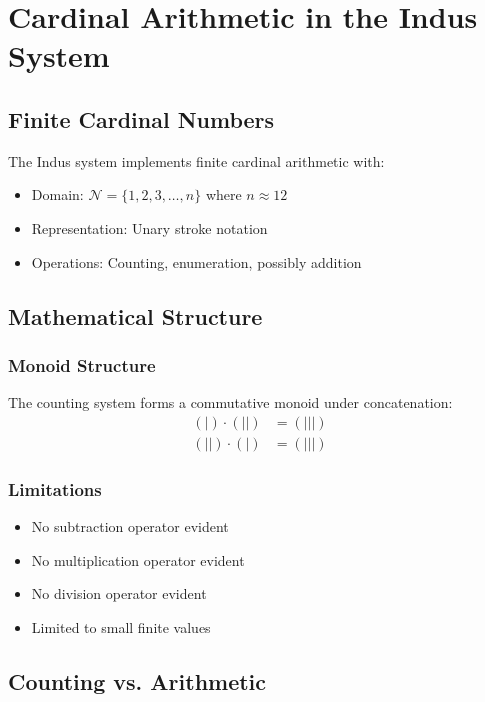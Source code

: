 \section{Cardinal Arithmetic in the Indus System}

\subsection{Finite Cardinal Numbers}

The Indus system implements finite cardinal arithmetic with:
\begin{itemize}
    \item Domain: $\mathcal{N} = \{1, 2, 3, \ldots, n\}$ where $n \approx 12$
    \item Representation: Unary stroke notation
    \item Operations: Counting, enumeration, possibly addition
\end{itemize}

\subsection{Mathematical Structure}

\subsubsection{Monoid Structure}
The counting system forms a commutative monoid under concatenation:
\begin{align*}
    (|) \cdot (||) &= (|||) \\
    (||) \cdot (|) &= (|||)
\end{align*}

\subsubsection{Limitations}
\begin{itemize}
    \item No subtraction operator evident
    \item No multiplication operator evident
    \item No division operator evident
    \item Limited to small finite values
\end{itemize}

\subsection{Counting vs. Arithmetic}

